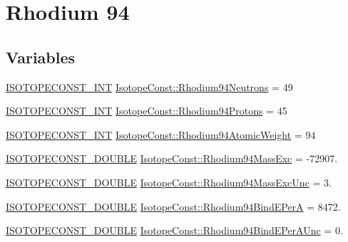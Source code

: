 \hypertarget{group___isotope_const-_rhodium-_rh94}{}\section{Rhodium 94}
\label{group___isotope_const-_rhodium-_rh94}
\subsection*{Variables}
\begin{DoxyCompactItemize}
\item 
\mbox{\hyperlink{group___isotope_const-_macros_ga5f18360b3e99483a35c32d789e62621c}{I\+S\+O\+T\+O\+P\+E\+C\+O\+N\+S\+T\+\_\+\+I\+NT}} \mbox{\hyperlink{group___isotope_const-_rhodium-_rh94_ga67a3f04da8dd750c7a7118ae54facbe5}{Isotope\+Const\+::\+Rhodium94\+Neutrons}} = 49
\item 
\mbox{\hyperlink{group___isotope_const-_macros_ga5f18360b3e99483a35c32d789e62621c}{I\+S\+O\+T\+O\+P\+E\+C\+O\+N\+S\+T\+\_\+\+I\+NT}} \mbox{\hyperlink{group___isotope_const-_rhodium-_rh94_ga7ea6a005aa472f1b49c825ddba1c714f}{Isotope\+Const\+::\+Rhodium94\+Protons}} = 45
\item 
\mbox{\hyperlink{group___isotope_const-_macros_ga5f18360b3e99483a35c32d789e62621c}{I\+S\+O\+T\+O\+P\+E\+C\+O\+N\+S\+T\+\_\+\+I\+NT}} \mbox{\hyperlink{group___isotope_const-_rhodium-_rh94_gaade61dbeee44380b1512a51460698691}{Isotope\+Const\+::\+Rhodium94\+Atomic\+Weight}} = 94
\item 
\mbox{\hyperlink{group___isotope_const-_macros_ga8f45a7272ce02c0b4c65c44636ed719a}{I\+S\+O\+T\+O\+P\+E\+C\+O\+N\+S\+T\+\_\+\+D\+O\+U\+B\+LE}} \mbox{\hyperlink{group___isotope_const-_rhodium-_rh94_gacd2ee5a09f70cd018d3635ee0fd09d16}{Isotope\+Const\+::\+Rhodium94\+Mass\+Exc}} = -\/72907.
\item 
\mbox{\hyperlink{group___isotope_const-_macros_ga8f45a7272ce02c0b4c65c44636ed719a}{I\+S\+O\+T\+O\+P\+E\+C\+O\+N\+S\+T\+\_\+\+D\+O\+U\+B\+LE}} \mbox{\hyperlink{group___isotope_const-_rhodium-_rh94_ga0b3b094890b802f81c2c126fe9f92669}{Isotope\+Const\+::\+Rhodium94\+Mass\+Exc\+Unc}} = 3.
\item 
\mbox{\hyperlink{group___isotope_const-_macros_ga8f45a7272ce02c0b4c65c44636ed719a}{I\+S\+O\+T\+O\+P\+E\+C\+O\+N\+S\+T\+\_\+\+D\+O\+U\+B\+LE}} \mbox{\hyperlink{group___isotope_const-_rhodium-_rh94_gadeb3d9c7df541582d7348d09e9f0f7c8}{Isotope\+Const\+::\+Rhodium94\+Bind\+E\+PerA}} = 8472.
\item 
\mbox{\hyperlink{group___isotope_const-_macros_ga8f45a7272ce02c0b4c65c44636ed719a}{I\+S\+O\+T\+O\+P\+E\+C\+O\+N\+S\+T\+\_\+\+D\+O\+U\+B\+LE}} \mbox{\hyperlink{group___isotope_const-_rhodium-_rh94_ga50738d65cb2957f07580bb11f7abd1bc}{Isotope\+Const\+::\+Rhodium94\+Bind\+E\+Per\+A\+Unc}} = 0.

\end{DoxyCompactItemize}
